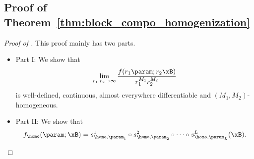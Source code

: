 \subsection{Proof of Theorem~\ref{thm:block_compo_homogenization}}
\begin{proof}[Proof of ]
This proof mainly has two parts. 

\begin{itemize}
    \item Part I: We show that 
    $$
    \lim_{r_1, r_2 \to \infty} \frac{f(r_1 \param; r_2 \xB)}{r_1^{M_1} r_2^{M_2}}
    $$
    is well-defined, continuous, almost everywhere differentiable and $(M_1,M_2)$-homogeneous.
    \item Part II: We show that 
    \begin{equation}
    \label{eq:homo_decomp_f}
        f_\homo(\param;\xB) = s_{\homo, \param_1}^1 \circ s_{\homo, \param_2}^2 \circ \cdots \circ s_{\homo, \param_L}^L (\xB).
    \end{equation}
\end{itemize}


\end{proof}
